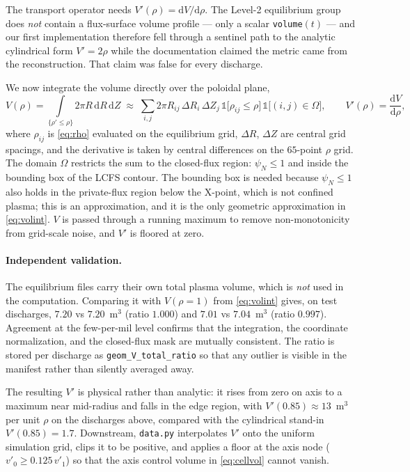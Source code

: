 The transport operator needs $V'(\rho) = \mathrm{d}V/\mathrm{d}\rho$. The
Level-2 equilibrium group does \emph{not} contain a flux-surface volume
profile --- only a scalar \texttt{volume}$(t)$ --- and our first
implementation therefore fell through a sentinel path to the analytic
cylindrical form $V' = 2\rho$ while the documentation claimed the metric
came from the reconstruction. That claim was false for every discharge.

We now integrate the volume directly over the poloidal plane,
\begin{equation}
V(\rho) = \int\limits_{\{\rho' \le \rho\}} 2\pi R \,\mathrm{d}R\,\mathrm{d}Z
\;\approx\;
\sum_{i,j} 2\pi R_{ij}\, \Delta R_i\, \Delta Z_j \,
\mathbb{1}\big[\rho_{ij} \le \rho\big]\,\mathbb{1}\big[(i,j) \in \Omega\big],
\qquad
V'(\rho) = \frac{\mathrm{d}V}{\mathrm{d}\rho},
\label{eq:volint}
\end{equation}
where $\rho_{ij}$ is \eqref{eq:rho} evaluated on the equilibrium grid,
$\Delta R$, $\Delta Z$ are central grid spacings, and the derivative is
taken by central differences on the $65$-point $\rho$ grid. The domain
$\Omega$ restricts the sum to the closed-flux region: $\psi_N \le 1$ and
inside the bounding box of the LCFS contour. The bounding box is needed
because $\psi_N \le 1$ also holds in the private-flux region below the
X-point, which is not confined plasma; this is an approximation, and it is
the only geometric approximation in \eqref{eq:volint}. $V$ is passed through
a running maximum to remove non-monotonicity from grid-scale noise, and
$V'$ is floored at zero.

\paragraph{Independent validation.} The equilibrium files carry their own
total plasma volume, which is \emph{not} used in the computation. Comparing
it with $V(\rho = 1)$ from \eqref{eq:volint} gives, on test discharges,
$7.20$ vs $7.20$~m$^3$ (ratio $1.000$) and $7.01$ vs $7.04$~m$^3$
(ratio $0.997$). Agreement at the few-per-mil level confirms that the
integration, the coordinate normalization, and the closed-flux mask are
mutually consistent. The ratio is stored per discharge as
\texttt{geom\_V\_total\_ratio} so that any outlier is visible in the
manifest rather than silently averaged away.

The resulting $V'$ is physical rather than analytic: it rises from zero on
axis to a maximum near mid-radius and falls in the edge region, with
$V'(0.85) \approx 13$~m$^3$ per unit $\rho$ on the discharges above,
compared with the cylindrical stand-in $V'(0.85) = 1.7$. Downstream,
\texttt{data.py} interpolates $V'$ onto the uniform simulation grid, clips
it to be positive, and applies a floor at the axis node
($v'_0 \ge 0.125\,v'_1$) so that the axis control volume in
\eqref{eq:cellvol} cannot vanish.

